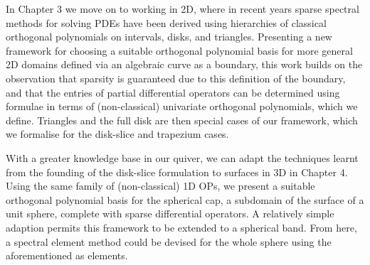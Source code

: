In Chapter 3 we move on to working in 2D, where in recent years sparse spectral methods for solving PDEs have been derived using hierarchies of classical orthogonal polynomials on intervals, disks, and triangles. Presenting a new framework for choosing a suitable orthogonal polynomial basis for more general 2D domains defined via an algebraic curve as a boundary, this work builds on the observation that sparsity is guaranteed due to this definition of the boundary, and that the entries of partial differential operators can be determined using formulae in terms of (non-classical) univariate orthogonal polynomials, which we define. Triangles and the full disk are then special cases of our framework, which we formalise for the disk-slice and trapezium cases.

With a greater knowledge base in our quiver, we can adapt the techniques learnt from the founding of the disk-slice formulation to surfaces in 3D in Chapter 4. Using the same family of (non-classical) 1D OPs, we present a suitable orthogonal polynomial basis for the spherical cap, a subdomain of the surface of a unit sphere, complete with sparse differential operators. A relatively simple adaption permits this framework to be extended to a spherical band. From here, a spectral element method could be devised for the whole sphere using the aforementioned as elements.

